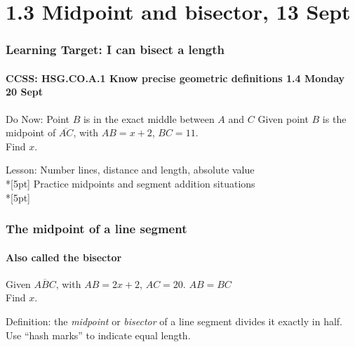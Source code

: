   \section{1.3 Midpoint and bisector, 13 Sept}
  \frame
  {
    \frametitle{Learning Target: I can bisect a length}
    \framesubtitle{CCSS: HSG.CO.A.1 Know precise geometric definitions  \hfill \alert{1.4 Monday 20 Sept}}
  
    \begin{block}{Do Now: Point $B$ is in the exact middle between $A$ and $C$}
      Given point $B$ is the midpoint of $\overline{AC}$, with $AB=x+2$, $BC=11$. \\[0.25cm]
      Find $x$.
        \begin{center}
        \end{center}
    \end{block}
    Lesson: Number lines, distance and length, absolute value \\*[5pt]
    Practice midpoints and segment addition situations \\*[5pt]
  }

  \frame
  {
    \frametitle{The midpoint of a line segment}
    \framesubtitle{Also called the bisector}
    Given $\overline{ABC}$, with $AB=2x+2$, $AC=20$. $AB=BC$ \\[0.15in]
    Find $x$.
      \begin{center}
      \end{center} \vspace{2cm}
      Definition: the \emph{midpoint} or \emph{bisector} of a line segment divides it exactly in half. Use ``hash marks'' to indicate equal length.
  }

